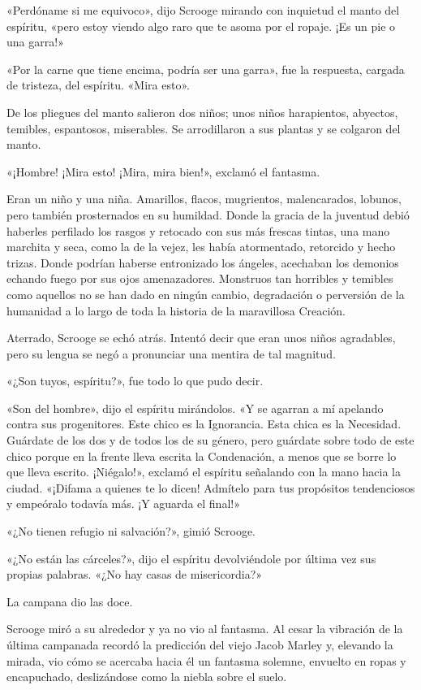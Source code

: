 \documentclass{novela}
\begin{document}
 «Perdóname si me equivoco», dijo Scrooge mirando con inquietud el manto del espíritu, «pero estoy viendo algo raro que te asoma por el ropaje. ¡Es un pie o una garra!»

 «Por la carne que tiene encima, podría ser una garra», fue la respuesta, cargada de tristeza, del espíritu. «Mira esto».

 De los pliegues del manto salieron dos niños; unos niños harapientos, abyectos, temibles, espantosos, miserables. Se arrodillaron a sus plantas y se colgaron del manto.

 «¡Hombre! ¡Mira esto! ¡Mira, mira bien!», exclamó el fantasma.

 Eran un niño y una niña. Amarillos, flacos, mugrientos, malencarados, lobunos, pero también prosternados en su humildad. Donde la gracia de la juventud debió haberles perfilado los rasgos y retocado con sus más frescas tintas, una mano marchita y seca, como la de la vejez, les había atormentado, retorcido y hecho trizas. Donde podrían haberse entronizado los ángeles, acechaban los demonios echando fuego por sus ojos amenazadores. Monstruos tan horribles y temibles como aquellos no se han dado en ningún cambio, degradación o perversión de la humanidad a lo largo de toda la historia de la maravillosa Creación.

 Aterrado, Scrooge se echó atrás. Intentó decir que eran unos niños agradables, pero su lengua se negó a pronunciar una mentira de tal magnitud.

 «¿Son tuyos, espíritu?», fue todo lo que pudo decir.

 «Son del hombre», dijo el espíritu mirándolos. «Y se agarran a mí apelando contra sus progenitores. Este chico es la Ignorancia. Esta chica es la Necesidad. Guárdate de los dos y de todos los de su género, pero guárdate sobre todo de este chico porque en la frente lleva escrita la Condenación, a menos que se borre lo que lleva escrito. ¡Niégalo!», exclamó el espíritu señalando con la mano hacia la ciudad. «¡Difama a quienes te lo dicen! Admítelo para tus propósitos tendenciosos y empeóralo todavía más. ¡Y aguarda el final!»

 «¿No tienen refugio ni salvación?», gimió Scrooge.

 «¿No están las cárceles?», dijo el espíritu devolviéndole por última vez sus propias palabras. «¿No hay casas de misericordia?»

 La campana dio las doce.

 Scrooge miró a su alrededor y ya no vio al fantasma. Al cesar la vibración de la última campanada recordó la predicción del viejo Jacob Marley y, elevando la mirada, vio cómo se acercaba hacia él un fantasma solemne, envuelto en ropas y encapuchado, deslizándose como la niebla sobre el suelo.
\end{document}
